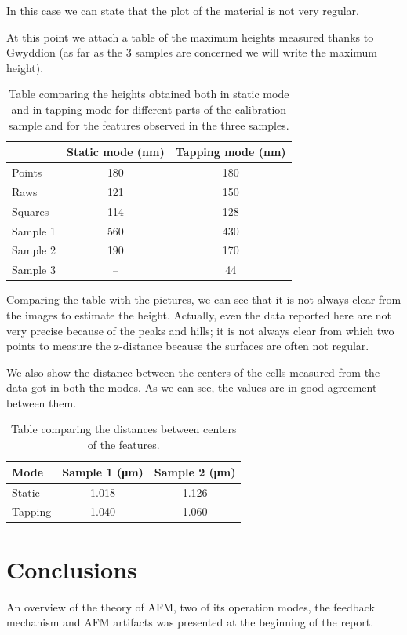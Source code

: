 \documentclass[11pt,a4paper]{article}
\begin{document}
In this case we can state that the plot of the material is not very regular.

At this point we attach a table of the maximum heights measured thanks to Gwyddion (as far as the 3 samples are concerned we will write the maximum height).

\begin{table}[H]
\centering
\begin{tabular}{l c c}
\toprule
& Static mode (\si{\nano\m}) & Tapping mode (\si{\nano\m})\\
\midrule
Points   & 180 & 180 \\
Raws     & 121 & 150 \\
Squares  & 114 & 128 \\
Sample 1 & 560 & 430 \\
Sample 2 & 190 & 170 \\
Sample 3 & -- & 44 \\
\bottomrule
\end{tabular}
\caption{Table comparing the heights obtained both in static mode and in tapping mode for different parts of the calibration sample and for the features observed in the three samples.}
\label{table:comparison}
\end{table}

Comparing the table with the pictures, we can see that it is not always clear from the images to estimate the height. Actually, even the data reported here are not very precise because of the peaks and hills; it is not always clear from which two points to measure the z-distance because the surfaces are often not regular.

We also show the distance between the centers of the cells measured from the data got in both the modes. As we can see, the values are in good agreement between them.

\begin{table}[H]
\centering
\begin{tabular}{l c c}
\toprule
Mode & Sample 1 (\si{\micro\m}) & Sample 2 (\si{\micro\m}) \\
\midrule
Static & 1.018 & 1.126 \\
Tapping & 1.040 & 1.060 \\
\bottomrule
\end{tabular}
\caption{Table comparing the distances between centers of the features.}
\label{table:comparison2}
\end{table}

\newpage
\section{Conclusions}
An overview of the theory of AFM, two of its operation modes, the feedback mechanism and AFM artifacts was presented at the beginning of the report.
\end{document}
